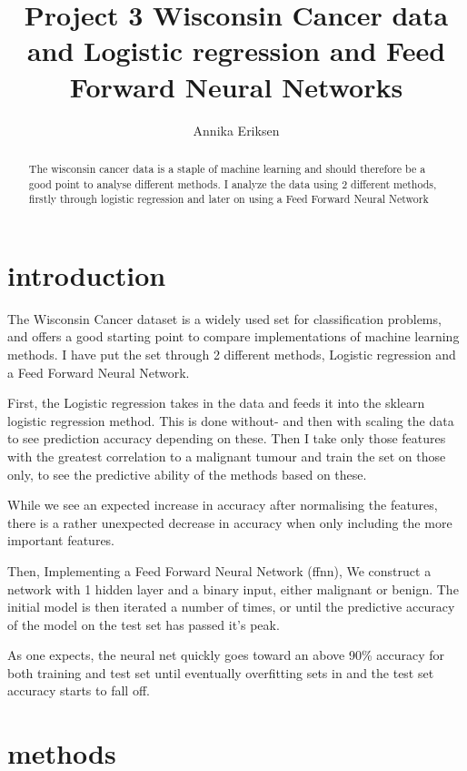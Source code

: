\documentclass[10pt]{article}
\title{Project 3
	Wisconsin Cancer data and Logistic regression and Feed Forward Neural Networks}
\author{Annika Eriksen}
\begin{document}
\maketitle

\begin{abstract}
	The wisconsin cancer data is a staple of machine learning and should therefore 
	be a good point to analyse different methods. I analyze the data using 2 different 
	methods, firstly through logistic regression and later on using a Feed Forward Neural
	Network 
\end{abstract}

\section{introduction}

The Wisconsin Cancer dataset is a widely used set for classification
problems, and offers a good starting point to compare implementations of
machine learning methods. I have put the set through 2 different methods,
Logistic regression and a Feed Forward Neural Network. 

First, the Logistic regression takes in the data and feeds it into the
sklearn logistic regression method.  This is done without- and then with
scaling the data to see prediction accuracy depending on these. Then I take
only those features with the greatest correlation to a malignant tumour and
train the set on those only, to see the predictive ability of the methods
based on these. 

While we see an expected increase in accuracy after normalising the features,
there is a rather unexpected decrease in accuracy when only including the more
important features.

Then, Implementing a Feed Forward Neural Network (ffnn), We construct a
network with 1 hidden layer and a binary input, either malignant or benign.
The initial model is then iterated a number of times, or until the
predictive accuracy of the model on the test set has passed it's peak. 

As one expects, the neural net quickly goes toward an above 90\% accuracy for
both training and test set until eventually overfitting sets in and the test
set accuracy starts to fall off. 



\section{methods}
\end{document}
